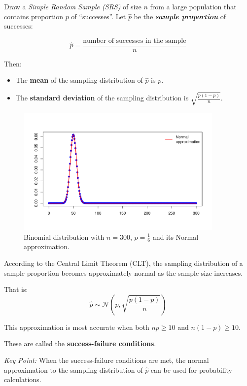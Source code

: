 Draw a \textit{Simple Random Sample (SRS)} of size \( n \) from a large population that contains proportion \( p \) of “successes”. Let \( \hat{p} \) be the \textbf{\textit{sample proportion}} of successes:

\[
\hat{p} = \frac{\text{number of successes in the sample}}{n}
\]

Then:

\begin{itemize}
  \item The \textbf{mean} of the sampling distribution of \( \hat{p} \) is \( p \).
  \item The \textbf{standard deviation} of the sampling distribution is \( \sqrt{ \frac{p(1 - p)}{n} } \).
\end{itemize}


\begin{figure}[h!]
  \centering
  \includegraphics[width=0.9\textwidth]{Section4/images/binomial_normal.pdf}
  \caption{Binomial distribution with \(n = 300\), \(p = \frac{1}{6}\) and its Normal approximation.}
\end{figure}


According to the Central Limit Theorem (CLT), the sampling distribution of a sample proportion becomes approximately normal as the sample size increases.

That is:
\[
\hat{p} \sim \mathcal{N}\left(p, \sqrt{\frac{p(1 - p)}{n}}\right)
\]

This approximation is most accurate when both \( np \geq 10 \) and \( n(1 - p) \geq 10 \).

These are called the \textbf{success-failure conditions}.

\medskip

\textit{Key Point:} When the success-failure conditions are met, the normal approximation to the sampling distribution of \( \hat{p} \) can be used for probability calculations.
